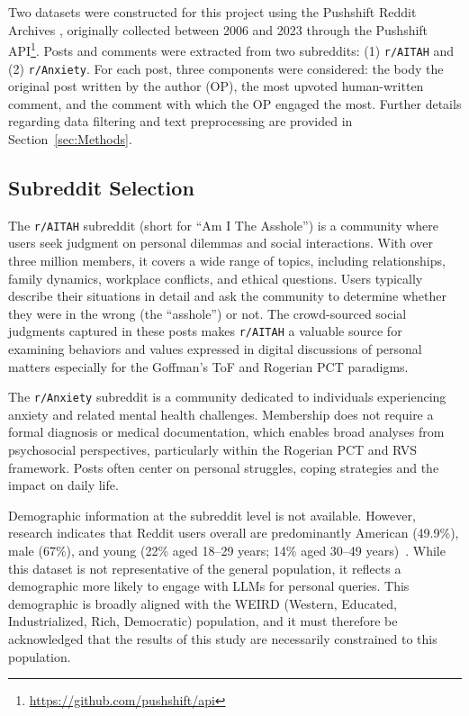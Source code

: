 Two datasets were constructed for this project using the Pushshift Reddit Archives \cite{pushshift}, originally collected between 2006 and 2023 through the Pushshift API\footnote{\url{https://github.com/pushshift/api}}. Posts and comments were extracted from two subreddits: (1) \texttt{r/AITAH} and (2) \texttt{r/Anxiety}. For each post, three components were considered: the body the original post written by the author (OP), the most upvoted human-written comment, and the comment with which the OP engaged the most. Further details regarding data filtering and text preprocessing are provided in Section~\ref{sec:Methods}.  

\subsection{Subreddit Selection}

The \texttt{r/AITAH} subreddit (short for ``Am I The Asshole'') is a community where users seek judgment on personal dilemmas and social interactions. With over three million members, it covers a wide range of topics, including relationships, family dynamics, workplace conflicts, and ethical questions. Users typically describe their situations in detail and ask the community to determine whether they were in the wrong (the ``asshole'') or not. The crowd-sourced social judgments captured in these posts makes \texttt{r/AITAH} a valuable source for examining behaviors and values expressed in digital discussions of personal matters especially for the Goffman's ToF and Rogerian PCT paradigms.  

The \texttt{r/Anxiety} subreddit is a community dedicated to individuals experiencing anxiety and related mental health challenges. Membership does not require a formal diagnosis or medical documentation, which enables broad analyses from psychosocial perspectives, particularly within the Rogerian PCT and RVS framework. Posts often center on personal struggles, coping strategies and the impact on daily life.

Demographic information at the subreddit level is not available. However, research indicates that Reddit users overall are predominantly American (49.9\%), male (67\%), and young (22\% aged 18--29 years; 14\% aged 30--49 years)~\cite{pew-reddit-research,statista-reddit}. While this dataset is not representative of the general population, it reflects a demographic more likely to engage with LLMs for personal queries. This demographic is broadly aligned with the WEIRD (Western, Educated, Industrialized, Rich, Democratic) population, and it must therefore be acknowledged that the results of this study are necessarily constrained to this population.


